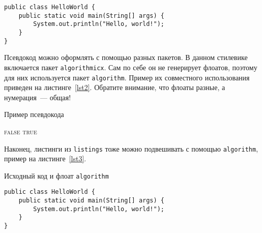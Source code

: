 \begin{lstlisting}[float=!h,caption={Пример исходного кода на Java},label={lst1}]
public class HelloWorld {
	public static void main(String[] args) {
		System.out.println("Hello, world!");
	}
}
\end{lstlisting}

Псевдокод можно оформлять с помощью разных пакетов. В данном стилевике включается пакет \texttt{algorithmicx}.
Сам по себе он не генерирует флоатов, поэтому для них используется пакет \texttt{algorithm}.
Пример их совместного использования приведен на листинге~\ref{lst2}. Обратите внимание, что флоаты разные, а 
нумерация~--- общая!

\begin{algorithm}[!h]
\caption{Пример псевдокода}\label{lst2}
\begin{algorithmic}
				\State\Return \textsc{false}
			\EndIf
		\EndFor
		\State\Return \textsc{true}
	\EndFunction
\end{algorithmic}
\end{algorithm}

Наконец, листинги из \texttt{listings} тоже можно подвешивать с помощью \texttt{algorithm},
пример на листинге~\ref{lst3}.

\begin{algorithm}[!h]
\caption{Исходный код и флоат \texttt{algorithm}}\label{lst3}
\begin{lstlisting}
public class HelloWorld {
	public static void main(String[] args) {
		System.out.println("Hello, world!");
	}
}
\end{lstlisting}
\end{algorithm}
